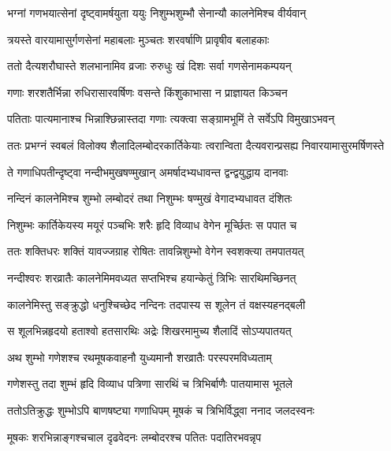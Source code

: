 \twolineshloka
{भग्नां गणभयात्सेनां दृष्ट्वामर्षयुता ययुः}
{निशुम्भशुम्भौ सेनान्यौ कालनेमिश्च वीर्यवान्} %


\twolineshloka
{त्रयस्ते वारयामासुर्गणसेनां महाबलाः}
{मुञ्चतः शरवर्षाणि प्रावृषीव बलाहकाः} %

\twolineshloka
{ततो दैत्यशरौघास्ते शलभानामिव व्रजाः}
{रुरुधुः खं दिशः सर्वा गणसेनामकम्पयन्} %

\twolineshloka
{गणाः शरशतैर्भिन्ना रुधिरासारवर्षिणः}
{वसन्ते किंशुकाभासा न प्राज्ञायत किञ्चन} %

\twolineshloka
{पतिताः पात्यमानाश्च भिन्नाश्छिन्नास्तदा गणाः}
{त्यक्त्वा सङ्ग्रामभूमिं ते सर्वेऽपि विमुखाऽभवन्} %

\fourlineindentedshloka
{ततः प्रभग्नं स्वबलं विलोक्य}
{शैलादिलम्बोदरकार्तिकेयाः}
{त्वरान्विता दैत्यवरान्प्रसह्य}
{निवारयामासुरमर्षिणस्ते} %





\twolineshloka
{ते गणाधिपतीन्दृष्ट्वा नन्दीभमुखषण्मुखान्}
{अमर्षादभ्यधावन्त द्वन्द्वयुद्धाय दानवाः} %

\twolineshloka
{नन्दिनं कालनेमिश्च शुम्भो लम्बोदरं तथा}
{निशुम्भः षण्मुखं वेगादभ्यधावत दंशितः} %

\twolineshloka
{निशुम्भः कार्तिकेयस्य मयूरं पञ्चभिः शरैः}
{हृदि विव्याध वेगेन मूर्च्छितः स पपात च} %

\twolineshloka
{ततः शक्तिधरः शक्तिं यावज्जग्राह रोषितः}
{तावन्निशुम्भो वेगेन स्वशक्त्या तमपातयत्} %

\twolineshloka
{नन्दीश्वरः शरव्रातैः कालनेमिमवध्यत}
{सप्तभिश्च हयान्केतुं त्रिभिः सारथिमच्छिनत्} %

\twolineshloka
{कालनेमिस्तु सङ्क्रुद्धो धनुश्चिच्छेद नन्दिनः}
{तदपास्य स शूलेन तं वक्षस्यहनद्बली} %

\twolineshloka
{स शूलभिन्नहृदयो हताश्वो हतसारथिः}
{अद्रेः शिखरमामुच्य शैलादिं सोऽप्यपातयत्} %

\twolineshloka
{अथ शुम्भो गणेशश्च रथमूषकवाहनौ}
{युध्यमानौ शरव्रातैः परस्परमविध्यताम्} %

\twolineshloka
{गणेशस्तु तदा शुम्भं हृदि विव्याध पत्रिणा}
{सारथिं च त्रिभिर्बाणैः पातयामास भूतले} %

\twolineshloka
{ततोऽतिक्रुद्धः शुम्भोऽपि बाणषष्ट्या गणाधिपम्}
{मूषकं च त्रिभिर्विद्ध्वा ननाद जलदस्वनः} %

\twolineshloka
{मूषकः शरभिन्नाङ्गश्चचाल दृढवेदनः}
{लम्बोदरश्च पतितः पदातिरभवन्नृप} %

